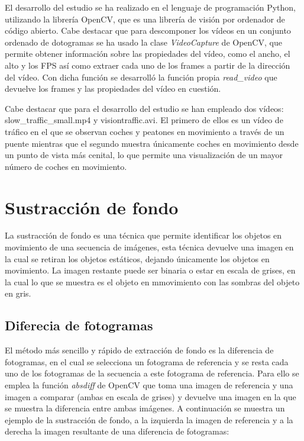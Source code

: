 \documentclass[a4paper,12pt]{article}
\begin{document}
{El desarrollo del estudio se ha realizado en el lenguaje de programación Python, utilizando la librería OpenCV, que es una librería de visión por ordenador de código abierto.
Cabe destacar que para descomponer los vídeos en un conjunto ordenado de dotogramas se ha usado la clase \textit{VideoCapture} de OpenCV, que permite obtener información
sobre las propiedades del vídeo, como el ancho, el alto y los FPS así como extraer cada uno de los frames a partir de la dirección del vídeo. Con dicha función se desarrolló
la función propia \textit{read\_video} que devuelve los frames y las propiedades del vídeo en cuestión.

\vspace{0.5cm}

Cabe destacar que para el desarrollo del estudio se han empleado dos vídeos: slow\_traffic\_small.mp4 y visiontraffic.avi. El primero de ellos es un vídeo de tráfico en el que se
observan coches y peatones en movimiento a través de un puente mientras que el segundo muestra únicamente coches en movimiento desde un punto de vista más cenital, lo que permite una
visualización de un mayor número de coches en movimiento.

\newpage


\section{Sustracción de fondo}


\vspace{1.cm}

La sustracción de fondo es una técnica que permite identificar los objetos en movimiento de una secuencia de imágenes, esta técnica devuelve una imagen en la cual se retiran
los objetos estáticos, dejando únicamente los objetos en movimiento. La imagen restante puede ser binaria o estar en escala de grises, en la cual lo que se muestra es el 
objeto en mmovimiento con las sombras del objeto en gris.

\vspace{0.5cm}

\subsection{Diferecia de fotogramas}

\vspace{0.5cm}

El método más sencillo y rápido de extracción de fondo es la diferencia de fotogramas, en el cual se selecciona un fotograma de referencia y se resta cada uno de los fotogramas
de la secuencia a este fotograma de referencia. Para ello se emplea la función \textit{absdiff} de OpenCV que toma una imagen de referencia y una imagen a comparar
(ambas en escala de grises) y devuelve una imagen en la que se muestra la diferencia entre ambas imágenes. A continuación se muestra un ejemplo de la sustracción de fondo, a la 
izquierda la imagen de referencia y a la derecha la imagen resultante de una diferencia de fotogramas:

}
\end{document}

